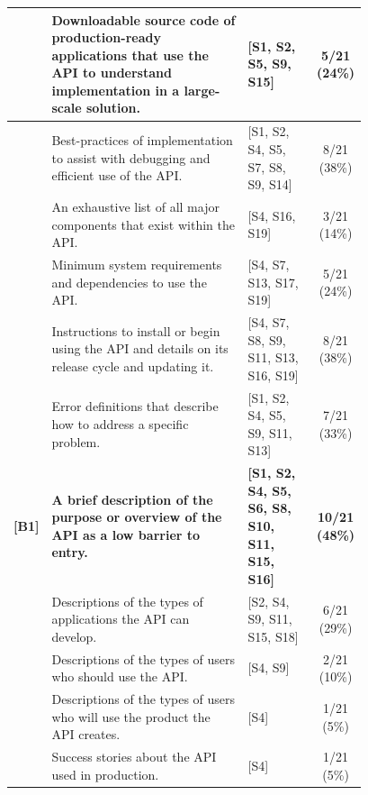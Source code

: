 \begin{table}[hbt]
\begin{tabular}{|rp{0.58\linewidth}||p{0.2\linewidth}|c|}
    \hline
    [A7]&
    Downloadable source code of production-ready applications that use the API to understand implementation in a large-scale solution.
    &
    [S1, S2, S5, S9, S15] &
    5/21 (24\%)\\

    \hline
    [A8]&
    Best-practices of implementation to assist with debugging and efficient use of the API.
    &
    [S1, S2, S4, S5, S7, S8, S9, S14] &
    8/21 (38\%)\\

    \hline
    [A9]&
    An exhaustive list of all major components that exist within the API.
    &
    [S4, S16, S19] &
    3/21 (14\%)\\

    \hline
    [A10]&
    Minimum system requirements and dependencies to use the API.
    &
    [S4, S7, S13, S17, S19] &
    5/21 (24\%)\\

    \hline
    [A11]&
    Instructions to install or begin using the API and details on its release cycle and updating it.
    &
    [S4, S7, S8, S9, S11, S13, S16, S19] &
    8/21 (38\%)\\

    \hline
    [A12]&
    Error definitions that describe how to address a specific problem.
    &
    [S1, S2, S4, S5, S9, S11, S13] &
    7/21 (33\%)\\

    \hline
    \hline
    \textbf{[B1]}&
    \textbf{A brief description of the purpose or overview of the API as a low barrier to entry.}
    &
    \textbf{[S1, S2, S4, S5, S6, S8, S10, S11, S15, S16]} &
    \textbf{10/21 (48\%)}\\

    \hline
    [B2]&
    Descriptions of the types of applications the API can develop.
    &
    [S2, S4, S9, S11, S15, S18] &
    6/21 (29\%)\\

    \hline
    [B3]&
    Descriptions of the types of users who should use the API.
    &
    [S4, S9] &
    2/21 (10\%)\\

    \hline
    [B4]&
    Descriptions of the types of users who will use the product the API creates.
    &
    [S4] &
    1/21 (5\%)\\

    \hline
    [B5]&
    Success stories about the API used in production.
    &
    [S4] &
    1/21 (5\%)\\


\end{tabular}
\end{table}
